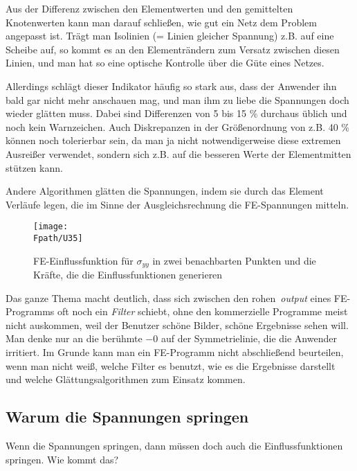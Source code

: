 {Aus der Differenz zwischen den Elementwerten und den gemittelten Knotenwerten kann man darauf schlie{\ss}en, wie gut ein Netz dem Problem angepasst ist. Tr\"{a}gt man Isolinien (= Linien gleicher Spannung) z.B. auf eine Scheibe auf, so kommt es an den Elementr\"{a}ndern zum Versatz zwischen diesen Linien, und man hat so eine optische Kontrolle \"{u}ber die G\"{u}te eines Netzes.

Allerdings schl\"{a}gt dieser Indikator h\"{a}ufig so stark aus, dass der Anwender ihn bald gar nicht mehr anschauen mag, und man ihm zu liebe die Spannungen doch wieder gl\"{a}tten muss. Dabei sind Differenzen von 5 bis 15 \% durchaus \"{u}blich und noch kein Warnzeichen. Auch Diskrepanzen in der Gr\"{o}{\ss}enordnung von z.B. 40 \% k\"{o}nnen noch tolerierbar sein, da man ja nicht notwendigerweise diese extremen Ausrei{\ss}er verwendet, sondern sich z.B. auf die besseren Werte der Elementmitten st\"{u}tzen kann.

Andere Algorithmen gl\"{a}tten die Spannungen, indem sie durch das Element Verl\"{a}ufe legen, die im Sinne der Ausgleichsrechnung die FE-Spannungen mitteln.

\begin{figure}
\centering
\if {} \sidecaption \fi
\texttt{[image: \\Fpath/U35]}
\caption{FE-Einflussfunktion f\"{u}r $\sigma_{yy}$ in zwei benachbarten Punkten und die Kr\"{a}fte, die die Einflussfunktionen generieren}
\label{U35}%
\end{figure}%

Das ganze Thema macht deutlich, dass sich zwischen den \glq rohen\grq\ {\em output\/} eines FE-Programms oft noch ein {\em Filter\/} schiebt, ohne den kommerzielle Programme meist nicht auskommen, weil der Benutzer sch\"{o}ne Bilder, sch\"{o}ne Ergebnisse sehen will. Man denke nur an die ber\"{u}hmte $-0$ auf der Symmetrielinie, die die Anwender irritiert. Im Grunde kann man ein FE-Programm nicht abschlie{\ss}end beurteilen, wenn man nicht wei{\ss}, welche Filter es benutzt, wie es die Ergebnisse darstellt und welche Gl\"{a}ttungsalgorithmen zum Einsatz kommen.

{\textcolor{sectionTitleBlue}{\section{Warum die Spannungen springen}}}\label{Jumps}
Wenn die Spannungen springen, dann m\"{u}ssen doch auch die Einflussfunktionen springen. Wie kommt das?

}
